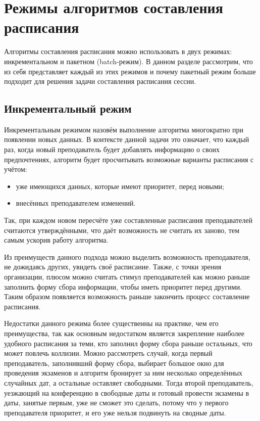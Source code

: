 \section{Режимы алгоритмов составления расписания} \label{ch2:sec2} 

Алгоритмы составления расписания можно использовать в двух режимах: инкрементальном и пакетном (batch-режим). В данном разделе рассмотрим, что из себя представляет каждый из этих режимов и почему пакетный режим больше подходит для решения задачи составления расписания сессии.

\subsection{Инкрементальный режим}

Инкрементальным режимом назовём выполнение алгоритма многократно при появлении новых данных. В контексте данной задачи это означает, что каждый раз, когда новый преподаватель будет добавлять информацию о своих предпочтениях, алгоритм будет просчитывать возможные варианты расписания с учётом:
\begin{itemize}
	\item уже имеющихся данных, которые имеют приоритет, перед новыми;
	\item внесённых преподавателем изменений.
\end{itemize}

Так, при каждом новом пересчёте уже составленные расписания преподавателей считаются утверждёнными, что даёт возможность не считать их заново, тем самым ускорив работу алгоритма.

Из преимуществ данного подхода можно выделить возможность преподавателя, не дожидаясь других, увидеть своё расписание. Также, с точки зрения организации, плюсом можно считать стимул преподавателей как можно раньше заполнить форму сбора информации, чтобы иметь приоритет перед другими. Таким образом появляется возможность раньше закончить процесс составление расписания. 

Недостатки данного режима более существенны на практике, чем его преимущества, так как основным недостатком является закрепление наиболее удобного расписания за теми, кто заполнил форму сбора раньше остальных, что может повлечь коллизии. Можно рассмотреть случай, когда первый преподаватель, заполнивший форму сбора, выбирает большое окно для проведения экзаменов и алгоритм бронирует за ним несколько определённых случайных дат, а остальные оставляет свободными. Тогда второй преподаватель, уезжающий на конференцию в свободные даты и готовый провести экзамены в даты, занятые первым, уже не сможет это сделать, потому что у первого преподавателя приоритет, и его уже нельзя подвинуть на сводные даты.

